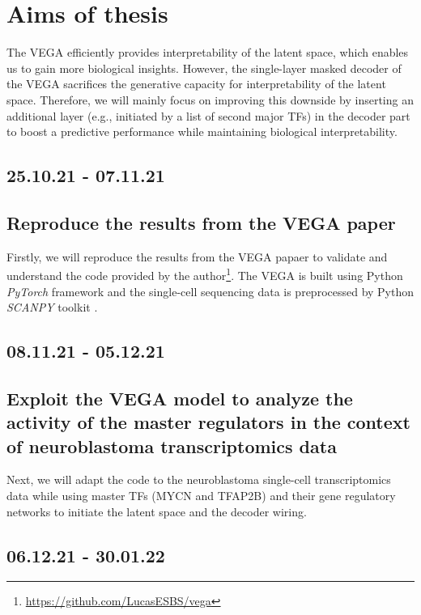 \documentclass[12pt, a4paper]{article}
\begin{document}
\section*{\large Aims of thesis}
The VEGA efficiently provides interpretability of the latent space, which enables us to gain more biological insights. However, the single-layer masked decoder of the VEGA sacrifices the generative capacity for interpretability of the latent space. Therefore, we will mainly focus on improving this downside by inserting an additional layer (e.g., initiated by a list of second major TFs) in the decoder part to boost a predictive performance while maintaining biological interpretability.
\vspace{-3mm} \subsection*{\normalsize 25.10.21 - 07.11.21}
\vspace{-3mm} \subsection*{\normalsize Reproduce the results from the VEGA paper}
Firstly, we will reproduce the results from the VEGA papaer to validate and understand the code provided by the author\footnote{\url{https://github.com/LucasESBS/vega}}. The VEGA is built using Python \textit{PyTorch} framework \cite{paszke2017} and the single-cell sequencing data is preprocessed by Python \textit{SCANPY} toolkit \cite{Wolf2018}.
\vspace{-3mm} \subsection*{\normalsize 08.11.21 - 05.12.21}
\vspace{-3mm} \subsection*{\normalsize Exploit the VEGA model to analyze the activity of the master regulators in the context of neuroblastoma transcriptomics data}
Next, we will adapt the code to the neuroblastoma single-cell transcriptomics data \cite{Jansky2021} while using master TFs (MYCN and TFAP2B) and their gene regulatory networks to initiate the latent space and the decoder wiring.
\vspace{-3mm} \subsection*{\normalsize 06.12.21 - 30.01.22}
\end{document}

